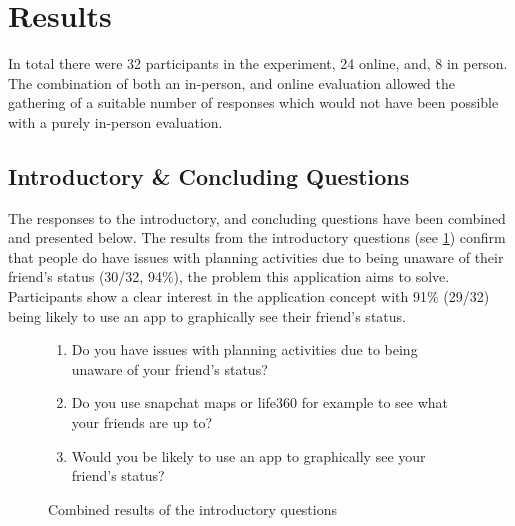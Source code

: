 \section{Results}
In total there were 32 participants in the experiment, 24 online, and, 8 in person. The combination of both an in-person, and online evaluation allowed the gathering of a suitable number of responses which would not have been possible with a purely in-person evaluation.

\subsection{Introductory \& Concluding Questions}
The responses to the introductory, and concluding questions have been combined and presented below. The results from the introductory questions (see \ref{fig:introAns}) confirm that people do have issues with planning activities due to being unaware of their friend's status (30/32, 94\%), the problem this application aims to solve. Participants show a clear interest in the application concept with 91\% (29/32) being likely to use an app to graphically see their friend's status. 

\begin{figure}[H]

\begin{enumerate}
    \item Do you have issues with planning activities due to being unaware of your friend's status?
    \item Do you use snapchat maps or life360 for example to see what your friends are up to?
    \item Would you be likely to use an app to graphically see your friend's status?
\end{enumerate}

\caption{Combined results of the introductory questions}
\label{fig:introAns}
\end{figure}
\FloatBarrier

